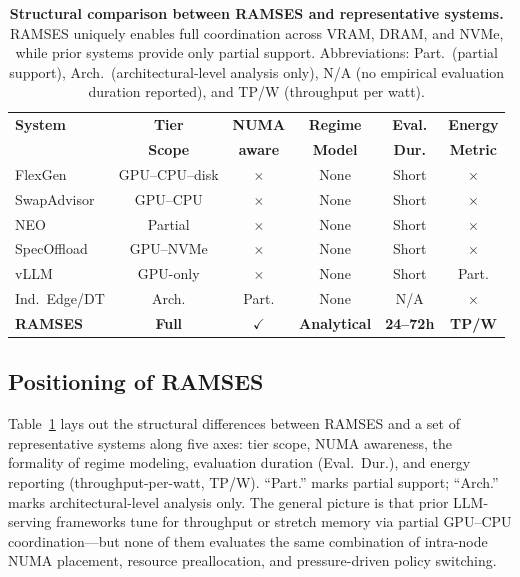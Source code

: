 \begin{table}[t]
\caption{\textbf{Structural comparison between RAMSES and representative systems.} RAMSES uniquely enables full coordination across VRAM, DRAM, and NVMe, while prior systems provide only partial support. Abbreviations: Part.\ (partial support), Arch.\ (architectural-level analysis only), N/A (no empirical evaluation duration reported), and TP/W (throughput per watt).}

\centering
\label{tab:related_positioning}
\setlength{\tabcolsep}{2.5pt}
\renewcommand{\arraystretch}{1.1}
\begin{tabular}{lccccc}
\toprule
\textbf{System} &
\textbf{Tier} &
\textbf{NUMA} &
\textbf{Regime} &
\textbf{Eval.} &
\textbf{Energy}\\
&
\textbf{Scope} &
\textbf{aware} &
\textbf{Model} &
\textbf{Dur.} &
\textbf{Metric} \\
\midrule
FlexGen      & GPU--CPU--disk& $\times$ & None & Short & $\times$ \\
SwapAdvisor  & GPU--CPU     & $\times$ & None & Short & $\times$ \\
NEO          & Partial      & $\times$ & None & Short & $\times$ \\
SpecOffload  & GPU--NVMe    & $\times$ & None & Short & $\times$ \\
vLLM         & GPU-only     & $\times$ & None & Short & Part.    \\
Ind.\ Edge/DT& Arch.        & Part.    & None & N/A   & $\times$ \\
\textbf{RAMSES}
              & \textbf{Full} & $\checkmark$ & \textbf{Analytical} & \textbf{24--72h} & \textbf{TP/W} \\
\bottomrule
\end{tabular}
\end{table}

\subsection{Positioning of RAMSES}
\label{sec:positioning}

Table~\ref{tab:related_positioning} lays out the structural differences
between RAMSES and a set of representative systems along five axes:
tier scope, NUMA awareness, the formality of regime modeling,
evaluation duration (Eval.~Dur.), and energy reporting (throughput-per-watt,
TP/W). ``Part.'' marks partial support; ``Arch.'' marks
architectural-level analysis only.
The general picture is that prior LLM-serving frameworks tune for
throughput or stretch memory via partial GPU--CPU coordination---but
none of them evaluates the same combination of intra-node NUMA placement, resource preallocation, and pressure-driven policy switching.

